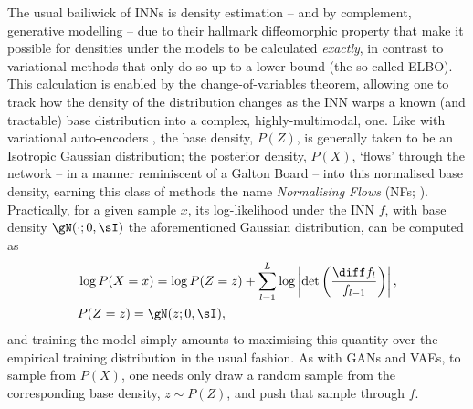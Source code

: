 The usual bailiwick of INNs is density estimation -- and by complement, generative modelling --
due to their hallmark diffeomorphic property that make it possible for densities under the models
to be calculated \emph{exactly}, in contrast to variational methods that only do so up to a lower
bound (the so-called ELBO). 
%
%
This calculation is enabled by the change-of-variables theorem, allowing one to track how the
density of the distribution changes as the INN warps a known (and tractable) base distribution into
a complex, highly-multimodal, one.
%
Like with variational auto-encoders \citep{kingma2014auto}, the base density, \(P(Z)\), is
generally taken to be an Isotropic Gaussian distribution; the posterior density, \(P(X)\), `flows'
through the network -- in a manner reminiscent of a Galton Board -- into this normalised base
density, earning this class of methods the name \emph{Normalising Flows} (NFs;
\cite{rezende2015variational, kobyzev2020normalizing}).
%
Practically, for a given sample \(x\), its log-likelihood under the INN \(f\), with base density
\(\gN(\cdot; 0, \sI)\) the aforementioned Gaussian distribution, can be computed as
%
\begin{equation*}
%
    \begin{aligned}
        &\log P(X=x) = 
        \log P(Z=z) + \sum_{l=1}^L \log \left| \det\left( \frac{\diff f_l}{ f_{l-1}}\right)
        \right|, \\
        &P(Z=z) = \gN(z; 0, \sI),
    \end{aligned}
\label{eq:cov}
%
\end{equation*}
%
and training the model simply amounts to maximising this quantity over the empirical training
distribution in the usual fashion.
%
As with GANs and VAEs, to sample from \(P(X)\), one needs only draw a random sample from the
corresponding base density, \(z \sim P(Z) \), and push that sample through \(f\).


